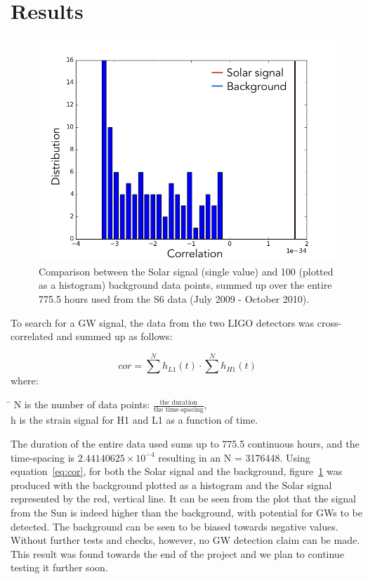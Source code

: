 \section{Results}
  \begin{figure}
  \includegraphics[width=\textwidth]{strain1}
  \caption{Comparison between the Solar signal (single value) and 100 (plotted as a histogram) background data points, summed up over the entire 775.5 hours used from the S6 data (July 2009 - October 2010).}
  \label{strain}
  \end{figure}
To search for a GW signal, the data from the two LIGO detectors was cross-correlated and summed up as follows:
\bigskip \bigskip \bigskip \bigskip \bigskip \bigskip

\begin{equation}
cor = \sum^N h_{L1}(t) \cdot \sum^N h_{H1}(t)
\label{eq:cor}
\end{equation}
where:
\begin{nstabbing}
\= \kill
N\> is the number of data points: $ \frac { \textrm{the duration}}{\textrm{the time-spacing}},$\\
h\> is the strain signal for H1 and L1 as a function of time.\\
\end{nstabbing}
The duration of the entire data used sums up to 775.5 continuous hours, and the time-spacing is $2.44140625 \times 10^{-4}$ resulting in an N = 3176448. Using equation~\ref{eq:cor}, for both the Solar signal and the background, figure~\ref{strain} was produced with the background plotted as a histogram and the Solar signal represented by the red, vertical line. It can be seen from the plot that the signal from the Sun is indeed higher than the background, with potential for GWs to be detected. The background can be seen to be biased towards negative values. Without further tests and checks, however, no GW detection claim can be made. This result was found towards the end of the project and we plan to continue testing it further soon. 


